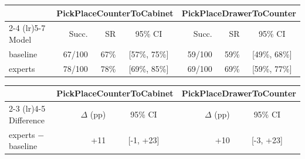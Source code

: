 \begin{tabular}{lrrcrrc}
\toprule
 & \multicolumn{3}{c}{PickPlaceCounterToCabinet} & \multicolumn{3}{c}{PickPlaceDrawerToCounter} \\
\cmidrule(lr){2-4} \cmidrule(lr){5-7}
Model & Succ. & SR & 95\% CI & Succ. & SR & 95\% CI \\
\midrule
baseline & 67/100 & 67\% & [57\%, 75\%] & 59/100 & 59\% & [49\%, 68\%] \\
experts & 78/100 & 78\% & [69\%, 85\%] & 69/100 & 69\% & [59\%, 77\%] \\
\bottomrule
\end{tabular}

\begin{tabular}{lrcrc}
\toprule
 & \multicolumn{2}{c}{PickPlaceCounterToCabinet} & \multicolumn{2}{c}{PickPlaceDrawerToCounter} \\
\cmidrule(lr){2-3} \cmidrule(lr){4-5}
Difference & $\Delta$ (pp) & 95\% CI & $\Delta$ (pp) & 95\% CI \\
\midrule
experts $-$ baseline & +11 & [-1, +23] & +10 & [-3, +23] \\
\bottomrule
\end{tabular}
